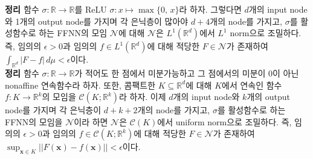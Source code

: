 \documentclass[11pt,onecolumn,twoside,a4size]{gsag3jnl}
\begin{document}
\noindent\textsf{\textbf{정리 \citep{hanin2017approximating}} 함수 $\sigma:\mathbb{R}\to\mathbb{R}$를 ReLU $\sigma:x\mapsto\max\{0,\,x\}$라 하자. 그렇다면 $d$개의 input node와 1개의 output node를 가지며 각 은닉층이 많아야 $d+4$개의 node를 가지고, $\sigma$를 활성함수로 하는 FFNN의 모임 $\mathcal{N}$에 대해 $\mathcal{N}$은 $L^1(\mathbb{R}^d)$에서 $L^1$ norm으로 조밀하다. 즉, 임의의 $\epsilon>0$과 임의의 $f\in L^1(\mathbb{R}^d)$에 대해 적당한 $F\in\mathcal{N}$가 존재하여 $\int_{\mathbb{R}^d}|F-f|\,d\mu<\epsilon$이다.}\\

\noindent\textsf{\textbf{정리 \citep{kidger2019universal}} 함수 $\sigma:\mathbb{R}\to\mathbb{R}$가 적어도 한 점에서 미분가능하고 그 점에서의 미분이 0이 아닌 nonaffine 연속함수라 하자. 또한, 콤팩트한 $K\subseteq\mathbb{R}^d$에 대해 $K$에서 연속인 함수 $f:K\to\mathbb{R}^k$의 모임을 $\mathcal{C}(K;\mathbb{R}^k)$라 하자. 이제 $d$개의 input node와 $k$개의 output node를 가지며 각 은닉층이 $d+k+2$개의 node를 가지고, $\sigma$를 활성함수로 하는 FFNN의 모임을 $\mathcal{N}$이라 하면 $\mathcal{N}$은 $\mathcal{C}(K)$에서 uniform norm으로 조밀하다. 즉, 임의의 $\epsilon>0$과 임의의 $f\in\mathcal{C}(K;\mathbb{R}^k)$에 대해 적당한 $F\in\mathcal{N}$가 존재하여 $\sup_{\mathbf{x}\in K}||F(\mathbf{x})-f(\mathbf{x})||<\epsilon$이다.}\\
\end{document}
